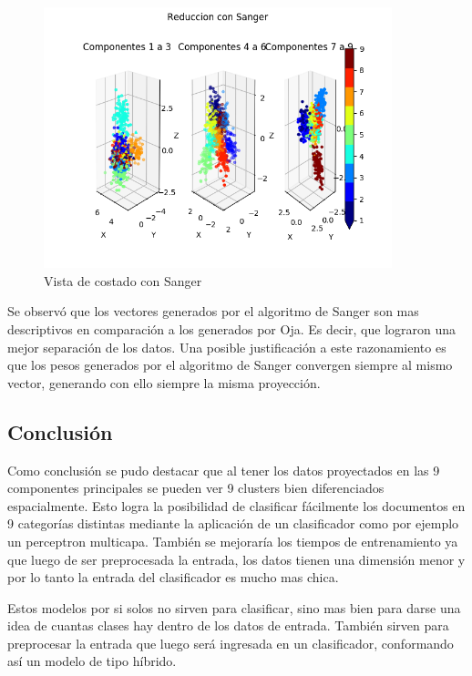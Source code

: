 \begin{figure}[H]
  \includegraphics[width=0.9\textwidth]{imagenes/componentes_sanger_3.png}
  \caption{Vista de costado con Sanger}
\end{figure}

Se observó que los vectores generados por el algoritmo de Sanger son mas
descriptivos en comparación a los generados por Oja.  Es decir, que lograron
una mejor separación de los datos. Una posible justificación a este
razonamiento es que los pesos generados por el algoritmo de Sanger convergen
siempre al mismo vector, generando con ello siempre la misma proyección.

\clearpage

\subsection{Conclusión}
Como conclusión se pudo destacar que al tener los datos proyectados en las 9
componentes principales se pueden ver 9 clusters bien diferenciados
espacialmente.  Esto logra la posibilidad de clasificar fácilmente los
documentos en 9 categorías distintas mediante la aplicación de un clasificador
como por ejemplo un perceptron multicapa.  También se mejoraría los tiempos de
entrenamiento ya que luego de ser preprocesada la entrada, los datos tienen una
dimensión menor y por lo tanto la entrada del clasificador es mucho mas chica.

Estos modelos por si solos no sirven para clasificar, sino mas bien para darse
una idea de cuantas clases hay dentro de los datos de entrada. También sirven
para preprocesar la entrada que luego será ingresada en un clasificador,
conformando así un modelo de tipo híbrido.
\newpage
